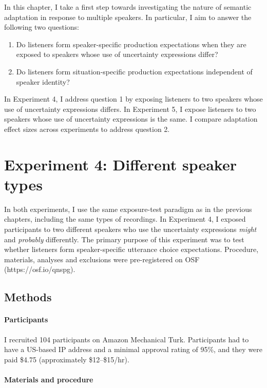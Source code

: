 In this chapter, I take a first step towards investigating the nature of semantic adaptation 
in response to multiple speakers. 
In particular,
I aim to answer the following two questions:
\begin{enumerate}
    \item Do listeners form speaker-specific production expectations when they are 
             exposed to speakers whose use of uncertainty expressions differ? 
    \item Do listeners form situation-specific production expectations independent of speaker identity?
\end{enumerate}    

In Experiment 4, I address question 1 by exposing listeners to two
speakers whose use of uncertainty expressions differs. In Experiment 5, I expose listeners to two speakers whose use of uncertainty expressions is the same. I compare adaptation effect sizes across experiments to address question 2.

\section{Experiment 4: Different speaker types}

In both experiments, I use the same exposure-test paradigm as in the previous chapters, including the same types of recordings.
In Experiment 4, I exposed participants to two different speakers who 
use the uncertainty expressions \textit{might} and \textit{probably} differently. 
The primary purpose of this experiment was to test whether listeners  
form speaker-specific  utterance choice expectations.
Procedure, materials, analyses and exclusions
were pre-registered on OSF (https://osf.io/qnspg).

\subsection{Methods}

\paragraph{Participants}
 I recruited 104 participants on Amazon Mechanical Turk. 
Participants had to have a US-based IP address and a minimal approval rating of 
95\%, and they were paid \$4.75 (approximately \$12--\$15/hr). 

\paragraph{Materials and procedure}

